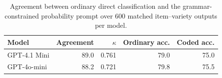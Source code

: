 \begin{table}[t]
\centering
\caption{Agreement between ordinary direct classification and the grammar-constrained probability prompt over 600 matched item--variety outputs per model.}
\label{tab:prompt-agreement}
\small
\begin{tabular}{lrrrr}
\toprule
Model & Agreement & $\kappa$ & Ordinary acc. & Coded acc. \\
\midrule
GPT-4.1 Mini & 89.0 & 0.761 & 79.0 & 75.0 \\
GPT-4o-mini & 88.2 & 0.721 & 79.8 & 75.5 \\
\bottomrule
\end{tabular}
\end{table}
